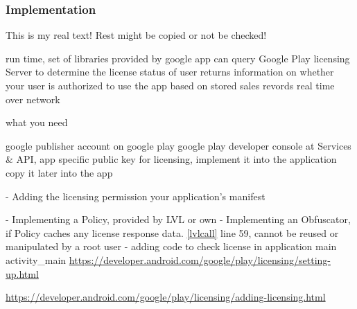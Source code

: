 \subsubsection{Implementation}\label{subsection:license-google-implementation}
This is my real text! Rest might be copied or not be checked!



%
run time, set of libraries provided by google
app can query Google Play licensing Server to determine the license status of user
returns information on whether your user is authorized to use the app based on stored sales revords
real time over network
\cite{developersLicensingBlog}
%

%
what you need

google publisher account on google play
google play developer console at Services \& API, app specific public key for licensing, implement it into the application
copy it later into the app

\cite{developersLicensingAdding}
%

%
- Adding the licensing permission your application's manifest


- Implementing a Policy, provided by LVL or own
- Implementing an Obfuscator, if Policy caches any license response data. \ref{lvlcall} line 59, cannot be reused or manipulated by a root user
- adding code to check license in application main activity\_main
\cite{developersLicensingAdding}
%
\url{https://developer.android.com/google/play/licensing/setting-up.html}

\url{https://developer.android.com/google/play/licensing/adding-licensing.html}




